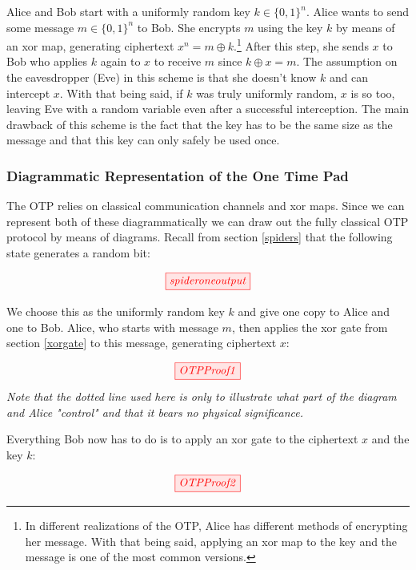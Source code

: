 \documentclass[]{article}
\begin{document}
Alice and Bob start with a uniformly random key $k \in \{0,1\}^n$. Alice wants to send some message $m \in \{0,1\}^n$ to Bob. She encrypts $m$ using the key $k$ by means of an xor map, generating ciphertext $x^n = m \oplus k$.\footnote{In different realizations of the OTP, Alice has different methods of encrypting her message. With that being said, applying an xor map to the key and the message is one of the most common versions.} After this step, she sends $x$ to Bob who applies $k$ again to $x$ to receive $m$ since $k \oplus x = m$. The assumption on the eavesdropper (Eve) in this scheme is that she doesn't know $k$ and can intercept $x$. With that being said, if $k$ was truly uniformly random, $x$ is so too, leaving Eve with a random variable even after a successful interception. The main drawback of this scheme is the fact that the key has to be the same size as the message and that this key can only safely be used once.

\subsubsection{Diagrammatic Representation of the One Time Pad}

The OTP relies on classical communication channels and xor maps. Since we can represent both of these diagrammatically we can draw out the fully classical OTP protocol by means of diagrams. Recall from section \ref{spiders} that the following state generates a random bit:

\begin{equation}
	\tikzfig{spideroneoutput}
\end{equation}

We choose this as the uniformly random key $k$ and give one copy to Alice and one to Bob. Alice, who starts with message $m$, then applies the xor gate from section \ref{xorgate} to this message, generating ciphertext $x$:

\begin{equation}
	\tikzfig{OTPProof1}
\end{equation}
\textit{Note that the dotted line used here is only to illustrate what part of the diagram and Alice "control" and that it bears no physical significance.}


Everything Bob now has to do is to apply an xor gate to the ciphertext $x$ and the key $k$:

\begin{equation}
\label{equation:OTPProof2}
\tikzfig{OTPProof2}
\end{equation}
\end{document}

